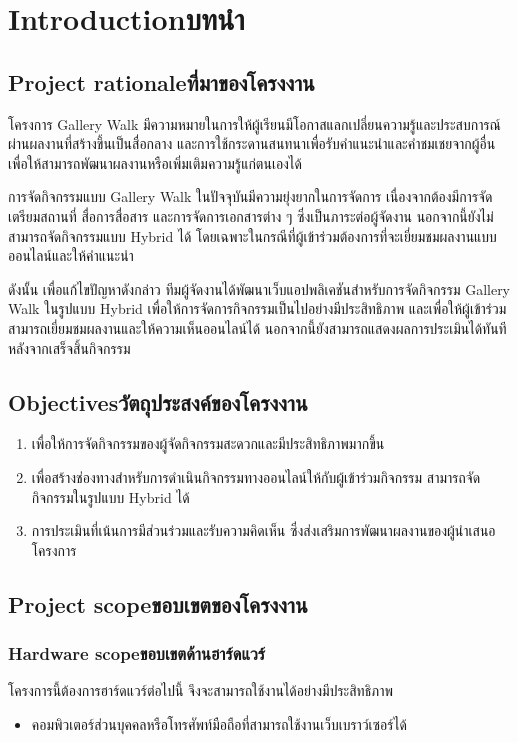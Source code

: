 \chapter{\ifenglish Introduction\else บทนำ\fi}

\section{\ifenglish Project rationale\else ที่มาของโครงงาน\fi}

โครงการ Gallery Walk มีความหมายในการให้ผู้เรียนมีโอกาสแลกเปลี่ยนความรู้และประสบการณ์ผ่านผลงานที่สร้างขึ้นเป็นสื่อกลาง และการใช้กระดานสนทนาเพื่อรับคำแนะนำและคำชมเชยจากผู้อื่น เพื่อให้สามารถพัฒนาผลงานหรือเพิ่มเติมความรู้แก่ตนเองได้

การจัดกิจกรรมแบบ Gallery Walk ในปัจจุบันมีความยุ่งยากในการจัดการ เนื่องจากต้องมีการจัดเตรียมสถานที่ สื่อการสื่อสาร และการจัดการเอกสารต่าง ๆ ซึ่งเป็นภาระต่อผู้จัดงาน นอกจากนี้ยังไม่สามารถจัดกิจกรรมแบบ Hybrid ได้ โดยเฉพาะในกรณีที่ผู้เข้าร่วมต้องการที่จะเยี่ยมชมผลงานแบบออนไลน์และให้คำแนะนำ

ดังนั้น เพื่อแก้ไขปัญหาดังกล่าว ทีมผู้จัดงานได้พัฒนาเว็บแอปพลิเคชันสำหรับการจัดกิจกรรม Gallery Walk ในรูปแบบ Hybrid เพื่อให้การจัดการกิจกรรมเป็นไปอย่างมีประสิทธิภาพ และเพื่อให้ผู้เข้าร่วมสามารถเยี่ยมชมผลงานและให้ความเห็นออนไลน์ได้ นอกจากนี้ยังสามารถแสดงผลการประเมินได้ทันทีหลังจากเสร็จสิ้นกิจกรรม

\section{\ifenglish Objectives\else วัตถุประสงค์ของโครงงาน\fi}
\begin{enumerate}
    \item เพื่อให้การจัดกิจกรรมของผู้จัดกิจกรรมสะดวกและมีประสิทธิภาพมากขึ้น
    \item เพื่อสร้างช่องทางสําหรับการดําเนินกิจกรรมทางออนไลน์ให้กับผู้เข้าร่วมกิจกรรม สามารถจัดกิจกรรมในรูปแบบ Hybrid ได้
    \item การประเมินที่เน้นการมีส่วนร่วมและรับความคิดเห็น ซึ่งส่งเสริมการพัฒนาผลงานของผู้นำเสนอโครงการ
\end{enumerate}

\section{\ifenglish Project scope\else ขอบเขตของโครงงาน\fi}

\subsection{\ifenglish Hardware scope\else ขอบเขตด้านฮาร์ดแวร์\fi}
โครงการนี้ต้องการฮาร์ดแวร์ต่อไปนี้ จึงจะสามารถใช้งานได้อย่างมีประสิทธิภาพ
\begin{itemize}
    \item คอมพิวเตอร์ส่วนบุคคลหรือโทรศัพท์มือถือที่สามารถใช้งานเว็บเบราว์เซอร์ได้
\end{itemize}

